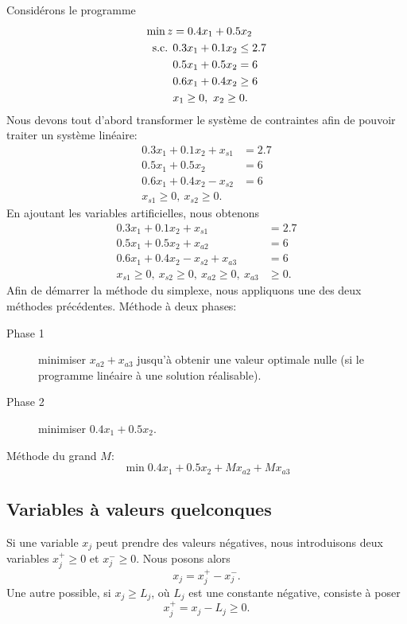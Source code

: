 \begin{example}
Considérons le programme
\begin{align*}
\min z & = 0.4 x_1 + 0.5 x_2 \\
\mbox{s.c. } & 0.3 x_1 + 0.1 x_2 \leq 2.7 \\
& 0.5 x_1 + 0.5 x_2 = 6 \\
& 0.6 x_1 + 0.4 x_2 \geq 6 \\
& x_1 \geq 0,\ x_2 \geq 0.
\end{align*}
Nous devons tout d'abord transformer le système de contraintes afin de pouvoir traiter un système linéaire:
\begin{align*}
0.3 x_1 + 0.1 x_2 + x_{s1} & = 2.7 \\
0.5 x_1 + 0.5 x_2 & = 6 \\
0.6 x_1 + 0.4 x_2 - x_{s2} & = 6 \\
x_{s1} \geq 0,\ x_{s2} \geq 0. &
\end{align*}
En ajoutant les variables artificielles, nous obtenons
\begin{align*}
0.3 x_1 + 0.1 x_2 + x_{s1} & = 2.7 \\
0.5 x_1 + 0.5 x_2 + x_{a2} & = 6 \\
0.6 x_1 + 0.4 x_2 - x_{s2} +x_{a3} & = 6 \\
x_{s1} \geq 0,\ x_{s2} \geq 0,\ x_{a2} \geq 0,\ x_{a3} & \geq 0. %
\end{align*}
Afin de démarrer la méthode du simplexe, nous appliquons une des deux méthodes précédentes.
Méthode à deux phases:
\begin{description}
\item[Phase 1] minimiser $x_{a2} + x_{a3}$ jusqu'à obtenir une valeur optimale nulle (si le programme linéaire à une solution réalisable).
\item[Phase 2] minimiser $0.4 x_1 + 0.5 x_2$.
\end{description}
Méthode du grand $M$:
\[
\min 0.4 x_1 + 0.5 x_2 + Mx_{a2} + Mx_{a3}
\]
\end{example}

\subsection{Variables à valeurs quelconques}

Si une variable $x_j$ peut prendre des valeurs négatives, nous introduisons deux variables $x_j^+ \geq 0$ et $x_j^- \geq 0$.
Nous posons alors
\[
x_j = x_j^+ - x_j^-.
\]
Une autre possible, si $x_j \geq L_j$, où $L_j$ est une constante négative, consiste à poser
\[
x_j^+ = x_j - L_j \geq 0.
\]


